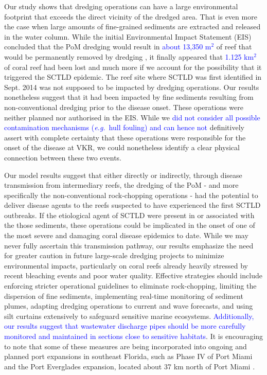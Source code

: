 \documentclass[preprint,12pt,authoryear]{elsarticle}
\newcommand{\modif}[1]{\textcolor{blue}{#1}}
\begin{document}
Our study shows that dredging operations can have a large environmental footprint that exceeds the direct vicinity of the dredged area. That is even more the case when large amounts of fine-grained sediments are extracted and released in the water column. While the initial Environmental Impact Statement (EIS) concluded that the PoM dredging would result in \modif{about 13,350 m$^{2}$} of reef that would be permanently removed by dredging \citep{USACE2004}, it finally appeared that \modif{1.125 km$^{2}$} of coral reef had been lost \citep{noaa2023sedimentation} and much more if we account for the possibility that it triggered the SCTLD epidemic. The reef site where SCTLD was first identified in Sept. 2014 was not supposed to be impacted by dredging operations. Our results nonetheless suggest that it had been impacted by fine sediments resulting from non-conventional dredging prior to the disease onset. These operations were neither planned nor authorised in the EIS. While we \modif{did not consider all possible contamination mechanisms (\textit{e.g.}~hull fouling) and can hence not} definitively assert with complete certainty that these operations were responsible for the onset of the disease at VKR, we could nonetheless identify a clear physical connection between these two events.

Our model results suggest that either directly or indirectly, through disease transmission from intermediary reefs, the dredging of the PoM - and more specifically the non-conventional rock-chopping operations - had the potential to deliver disease agents to the reefs suspected to have experienced the first SCTLD outbreaks. If the etiological agent of SCTLD were present in or associated with the those sediments, these operations could be implicated in the onset of one of the most severe and damaging coral disease epidemics to date. While we may never fully ascertain this transmission pathway, our results emphasize the need for greater caution in future large-scale dredging projects to minimize environmental impacts, particularly on coral reefs already heavily stressed by recent bleaching events and poor water quality. Effective strategies should include enforcing stricter operational guidelines to eliminate rock-chopping, limiting the dispersion of fine sediments, implementing real-time monitoring of sediment plumes, adapting dredging operations to current and wave forecasts, and using silt curtains extensively to safeguard sensitive marine ecosystems. \modif{Additionally, our results suggest that wastewater discharge pipes should be more carefully monitored and maintained in sections close to sensitive habitats}. It is encouraging to note that some of these measures are being incorporated into ongoing and planned port expansions in southeast Florida, such as Phase IV of Port Miami and the Port Everglades expansion, located about 37 km north of Port Miami \citep{noaa2023sedimentation}.
\end{document}
